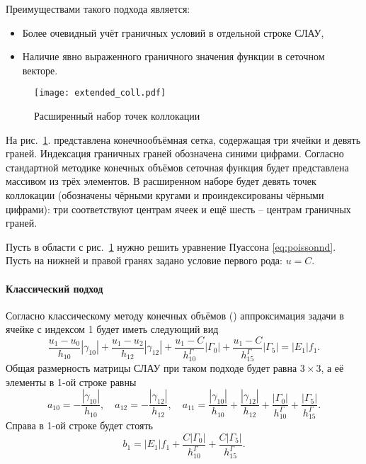 Преимуществами такого подхода является:
\begin{itemize}
\item Более очевидный учёт граничных условий в отдельной строке СЛАУ,
\item Наличие явно выраженного граничного значения функции в сеточном векторе.
\end{itemize}

\begin{figure}[h]
\centering
\texttt{[image: extended\_coll.pdf]}
\caption{Расширенный набор точек коллокации}
\label{fig:extended_coll}
\end{figure}

На рис.~\ref{fig:extended_coll}.
представлена конечнообъёмная сетка, содержащая три ячейки
и девять граней. Индексация граничных граней обозначена синими цифрами.
Согласно стандартной методике конечных
объёмов сеточная функция
будет представлена массивом из трёх элементов.
В расширенном наборе будет девять точек коллокации (обозначены чёрными кругами и проиндексированы чёрными цифрами):
три соответствуют центрам ячеек и ещё шесть -- центрам граничных граней.

Пусть в области с рис.~\ref{fig:extended_coll} нужно решить
уравнение Пуассона \cref{eq:poissonnd}.
Пусть на нижней и правой гранях задано условие первого рода: $u = C$.

\paragraph{Классический подход}
Согласно классическому методу конечных объёмов
()
аппроксимация задачи в ячейке с индексом 1 будет иметь следующий вид
$$
\frac{u_1 - u_0}{h_{10}}|\gamma_{10}|
+\frac{u_1 - u_2}{h_{12}}|\gamma_{12}|
+\frac{u_1 - C}{h^\Gamma_{10}}|\Gamma_0|
+\frac{u_1 - C}{h^\Gamma_{15}}|\Gamma_5|
= |E_1| f_1.
$$
Общая размерность матрицы СЛАУ при таком подходе будет
равна $3\times3$, а её элементы в 1-ой строке равны
$$
a_{10} = -\frac{|\gamma_{10}|}{h_{10}},  \quad
a_{12} = -\frac{|\gamma_{12}|}{h_{12}},  \quad
a_{11} = \frac{|\gamma_{10}|}{h_{10}}  + \frac{|\gamma_{12}|}{h_{12}} + \frac{|\Gamma_{0}|}{h^\Gamma_{10}} + \frac{|\Gamma_5|}{h^\Gamma_{15}}.
$$
Справа в 1-ой строке будет стоять
$$
b_1 = |E_1| f_1 + \frac{C |\Gamma_0|}{h^\Gamma_{10}} + \frac{C |\Gamma_5|}{h^\Gamma_{15}}.
$$


